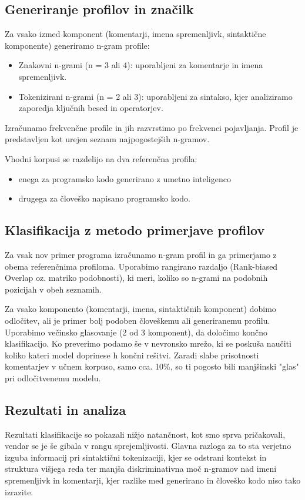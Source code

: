 \documentclass[sigconf,nonacm]{acmart}
\begin{document}
\subsection{Generiranje profilov in značilk}
Za vsako izmed komponent (komentarji, imena spremenljivk, sintaktične komponente) generiramo n-gram profile:
\begin{itemize}
	\item Znakovni n-grami (n = 3 ali 4): uporabljeni za komentarje in imena spremenljivk.
	\item Tokenizirani n-grami (n = 2 ali 3): uporabljeni za sintakso, kjer analiziramo zaporedja ključnih besed in operatorjev.
\end{itemize}
Izračunamo frekvenčne profile in jih razvrstimo po frekvenci pojavljanja. Profil je predstavljen kot urejen seznam najpogostejših n-gramov.

Vhodni korpusi se razdelijo na dva referenčna profila:
\begin{itemize}
	\item enega za programsko kodo generirano z umetno inteligenco
	\item drugega za človeško napisano programsko kodo.
\end{itemize}

\subsection{Klasifikacija z metodo primerjave profilov}
Za vsak nov primer programa izračunamo n-gram profil in ga primerjamo z obema referenčnima profiloma. Uporabimo rangirano razdaljo (Rank-biased Overlap oz. matriko podobnosti), ki meri, koliko so n-grami na podobnih pozicijah v obeh seznamih.

Za vsako komponento (komentarji, imena, sintaktičnih komponent) dobimo odločitev, ali je primer bolj podoben človeškemu ali generiranemu profilu. Uporabimo večinsko glasovanje (2 od 3 komponent), da določimo končno klasifikacijo. Ko preverimo podamo še v nevronsko mrežo, ki se poskuša naučiti koliko kateri model doprinese h končni rešitvi.
Zaradi slabe prisotnosti komentarjev v učnem korpuso, samo cca. 10\%, so ti pogosto bili manjšinski "glas" pri odločitvenemu modelu.

\subsection{Rezultati in analiza}
Rezultati klasifikacije so pokazali nižjo natančnost, kot smo sprva pričakovali, vendar se je še gibala v rangu sprejemljivosti. Glavna razloga za to sta verjetno izguba informacij pri sintaktični tokenizaciji, kjer se odstrani kontekst in struktura višjega reda ter manjša diskriminativna moč n-gramov nad imeni spremenljivk in komentarji, kjer razlike med generirano in človeško kodo niso tako izrazite.
\end{document}
